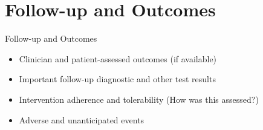 
\section{Follow-up and Outcomes}
\begin{frame}{Follow-up and Outcomes}
    \begin{itemize}
        \item Clinician and patient-assessed outcomes (if available)
        \item Important follow-up diagnostic and other test results
        \item Intervention adherence and tolerability (How was this assessed?)
        \item Adverse and unanticipated events
    
    \end{itemize}
\end{frame}
